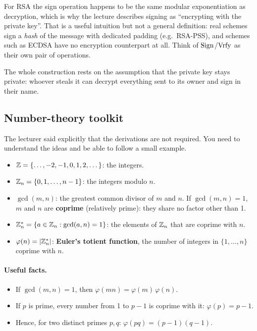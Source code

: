 \begin{remark}
For RSA the sign operation happens to be the same modular exponentiation as decryption, which is why the lecture describes signing as \enquote{encrypting with the private key}. That is a useful intuition but not a general definition: real schemes sign a \emph{hash} of the message with dedicated padding (e.g.\ RSA-PSS), and schemes such as ECDSA have no encryption counterpart at all. Think of $\operatorname{Sign}$/$\operatorname{Vrfy}$ as their own pair of operations.
\end{remark}

The whole construction rests on the assumption that the private key stays private: whoever steals it can decrypt everything sent to its owner and sign in their name.

\subsection{Number-theory toolkit}

The lecturer said explicitly that the derivations are not required. You need to understand the ideas and be able to follow a small example.

\begin{definition}[Notation]
\leavevmode
\begin{itemize}
    \item $\mathbb{Z} = \{\dots,-2,-1,0,1,2,\dots\}$: the integers.
    \item $\mathbb{Z}_n = \{0,1,\dots,n-1\}$: the integers modulo $n$.
    \item $\gcd(m,n)$: the greatest common divisor of $m$ and $n$. If $\gcd(m,n)=1$, $m$ and $n$ are \textbf{coprime} (relatively prime): they share no factor other than 1.
    \item $\mathbb{Z}_n^* = \{a \in \mathbb{Z}_n : \gcd(a,n)=1\}$: the elements of $\mathbb{Z}_n$ that are coprime with $n$.
    \item $\varphi(n) = |\mathbb{Z}_n^*|$: \textbf{Euler's totient function}, the number of integers in $\{1,\dots,n\}$ coprime with $n$.
\end{itemize}
\end{definition}

\paragraph{Useful facts.}
\begin{itemize}
    \item If $\gcd(m,n)=1$, then $\varphi(mn) = \varphi(m)\,\varphi(n)$.
    \item If $p$ is prime, every number from 1 to $p-1$ is coprime with it: $\varphi(p) = p-1$.
    \item Hence, for two distinct primes $p, q$: $\varphi(pq) = (p-1)(q-1)$.
\end{itemize}

